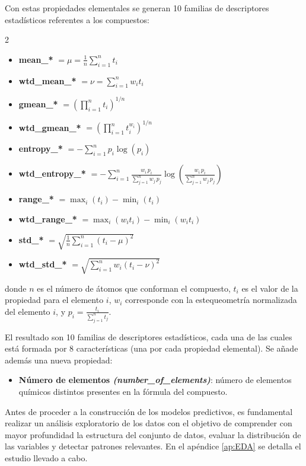 \documentclass[titlepage, 11pt]{book}
\begin{document}
Con estas propiedades elementales se generan 10 familias de descriptores estadísticos referentes a los compuestos:
\begin{multicols}{2}
\begin{itemize}
    \item \textbf{mean\_*} $=\mu = \frac{1}{n} \sum_{i=1}^{n} t_i$
    \item \textbf{wtd\_mean\_*} $=\nu = \sum_{i=1}^{n} w_i t_i$
    \item \textbf{gmean\_*} $=\left(\prod_{i=1}^{n} t_i\right)^{1/n}$
    \item \textbf{wtd\_gmean\_*} $=\left(\prod_{i=1}^{n} t_i^{w_i}\right)^{1/n}$
    \item \textbf{entropy\_*} $=-\sum_{i=1}^{n} p_i \log(p_i)$
    \item \textbf{wtd\_entropy\_*} $=-\sum_{i=1}^{n} \frac{w_i\, p_i}{\sum_{j=1}^{n} w_j\, p_j} \log{\left(\frac{w_i\, p_i}{\sum_{j=1}^{n} w_j\, p_j}\right)}$
    \item \textbf{range\_*} $=\max_i(t_i)-\min_i(t_i)$
    \item \textbf{wtd\_range\_*} $=\max_i(w_i t_i)-\min_i(w_i t_i)$
    \item \textbf{std\_*} $=\sqrt{\frac{1}{n}\sum_{i=1}^{n}(t_i-\mu)^2}$
    \item \textbf{wtd\_std\_*} $=\sqrt{\sum_{i=1}^{n} w_i (t_i-\nu)^2}$
\end{itemize}
\end{multicols}
donde $n$ es el número de átomos que conforman el compuesto, $t_i$ es el valor de la propiedad para el elemento $i$, $w_i$ corresponde con la estequeometría normalizada del elemento $i$, y $p_i=\frac{t_i}{\sum_{j=1}^{n} t_j}$.

El resultado son 10 familias de descriptores estadísticos, cada una de las cuales está formada por 8 características (una por cada propiedad elemental). Se añade además una nueva propiedad:
\begin{itemize}
    \item \textbf{Número de elementos \textit{(number\_of\_elements)}}: número de elementos químicos distintos presentes en la fórmula del compuesto.
\end{itemize}

Antes de proceder a la construcción de los modelos predictivos, es fundamental realizar un análisis exploratorio de los datos con el objetivo de comprender con mayor profundidad la estructura del conjunto de datos, evaluar la distribución de las variables y detectar patrones relevantes. En el apéndice \ref{ap:EDA} se detalla el estudio llevado a cabo.
\end{document}
